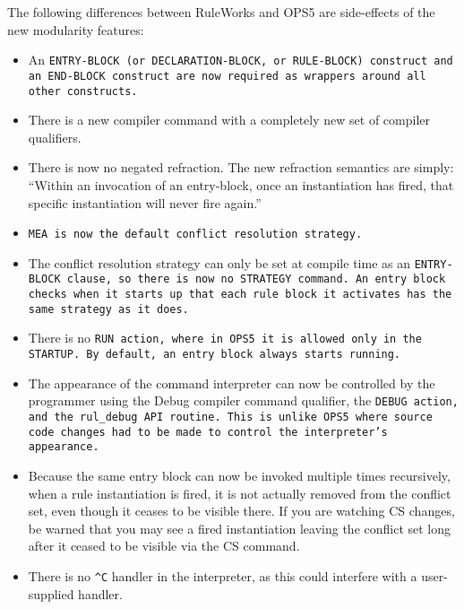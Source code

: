 The following differences between RuleWorks and OPS5 are side-effects
of the new modularity features:
\begin{itemize}
\item An \tt{ENTRY-BLOCK} (or \tt{DECLARATION-BLOCK}, or
  \tt{RULE-BLOCK}) construct and an \tt{END-BLOCK} construct are now
  required as wrappers around all other constructs.

\item There is a new compiler command with a completely new set of
  compiler qualifiers.

\item There is now no negated refraction.  The new refraction
  semantics are simply: ``Within an invocation of an entry-block, once
  an instantiation has fired, that specific instantiation will never
  fire again.''

\item \tt{MEA} is now the default conflict resolution strategy.

\item The conflict resolution strategy can only be set at compile time
  as an \tt{ENTRY-BLOCK} clause, so there is now no \tt{STRATEGY}
  command. An entry block checks when it starts up that each rule
  block it activates has the same strategy as it does.

\item There is no \tt{RUN} action, where in OPS5 it is allowed only in
  the \tt{STARTUP}. By default, an entry block always starts running.

\item The appearance of the command interpreter can now be controlled
  by the programmer using the Debug compiler command qualifier, the
  \tt{DEBUG} action, and the \verb|rul_debug| API routine. This is
  unlike OPS5 where source code changes had to be made to control the
  interpreter's appearance.

\item Because the same entry block can now be invoked multiple times
  recursively, when a rule instantiation is fired, it is not actually
  removed from the conflict set, even though it ceases to be visible
  there. If you are watching CS changes, be warned that you may see a
  fired instantiation leaving the conflict set long after it ceased to
  be visible via the CS command.

\item There is no \verb|^C| handler in the interpreter, as this could
  interfere with a user-supplied handler.


\end{itemize}
